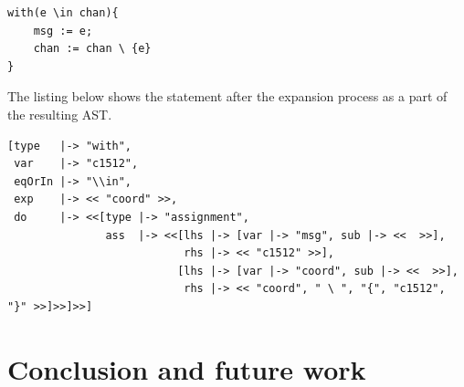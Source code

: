 \documentclass{thesul}
\begin{document}
\begin{lstlisting}
with(e \in chan){
	msg := e;
	chan := chan \ {e}
}
\end{lstlisting}

The listing below shows the statement after the expansion process as a part of the resulting AST.

\begin{lstlisting}
[type   |-> "with", 
 var    |-> "c1512",
 eqOrIn |-> "\\in",
 exp    |-> << "coord" >>,
 do     |-> <<[type |-> "assignment",
               ass  |-> <<[lhs |-> [var |-> "msg", sub |-> <<  >>],
                           rhs |-> << "c1512" >>], 
                          [lhs |-> [var |-> "coord", sub |-> <<  >>],
                           rhs |-> << "coord", " \ ", "{", "c1512", "}" >>]>>]>>]

\end{lstlisting}

\label{chanexpand}
\chapter{Conclusion and future work}
\end{document}

